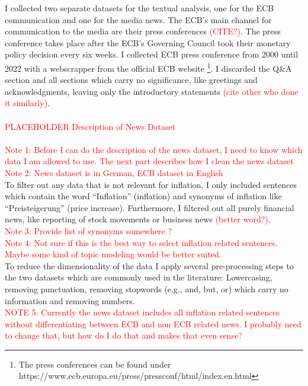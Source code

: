\documentclass[review]{elsarticle}
\begin{document}
I collected two separate datasets for the textual analysis, one for the ECB communication and one for the media news.
The ECB’s main channel for communication to the media are their press conferences \textcolor{red}{(CITE?)}. The press conference takes place after the ECB’s Governing Council took their monetary policy decision every six weeks. I collected ECB press conference from 2000 until 2022 with a webscrapper from the official ECB website \footnote[1]{The press conferences can be found under https://www.ecb.europa.eu/press/pressconf/html/index.en.html}. I discarded the Q\&A section and all sections which carry no significance, like greetings and acknowledgments, leaving only the introductory statements \textcolor{red}{(cite other who done it similarly)}.
\\
\\
\textcolor{red}{PLACEHOLDER Description of News Dataset}
\\
\\
\textcolor{red}{Note 1: Before I can do the description of the news dataset, I need to know which data I am allowed to use. The next part describes how I clean the news dataset}
\\
\textcolor{red}{Note 2: News dataset is in German, ECB dataset in English}
\\
To filter out any data that is not relevant for inflation, I only included sentences which contain the word “Inflation” (inflation) and synonyms of inflation like “Preisteigerung” (price increase). Furthermore, I filtered out all purely financial news, like reporting of stock movements or business news \textcolor{red}{(better word?)}.
\\
\textcolor{red}{Note 3: Provide list of synonyms somewhere ?}
\\
\textcolor{red}{Note 4: Not sure if this is the best way to select inflation related sentences. Maybe some kind of topic modeling would be better suited.}
\\
To reduce the dimensionality of the data I apply several pre-processing steps to the two datasets which are commonly used in the literature: Lowercasing, removing punctuation, removing stopwords (e.g., and, but, or) which carry no information and removing numbers.
\\
\textcolor{red}{NOTE 5: Currently the news dataset includes all inflation related sentences without differentiating between ECB and non ECB related news. I probably need to change that, but how do I do that and makes that even sense?}
\end{document}
